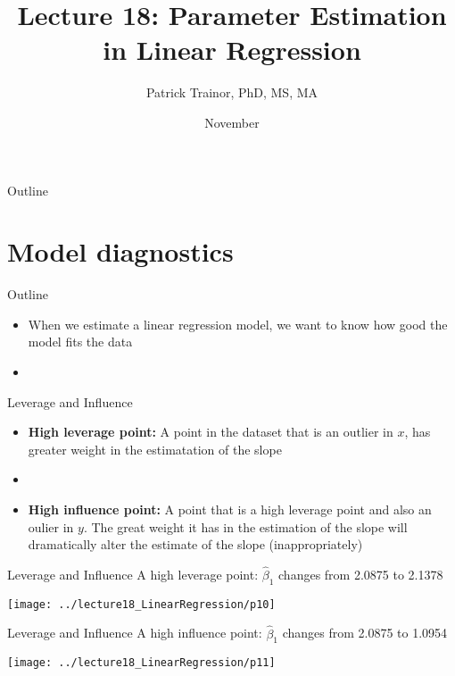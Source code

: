 \documentclass[xcolor=dvipsnames]{beamer}
\title[Lecture 18]{Lecture 18: Parameter Estimation in Linear Regression}
\author[Patrick Trainor]{Patrick Trainor, PhD, MS, MA}
\institute[NMSU]{New Mexico State University}
\date{November}
\begin{document}
\begin{frame}
\maketitle
\end{frame}

\begin{frame}{Outline}
\tableofcontents[hideallsubsections]
\end{frame}

\section{Model diagnostics}
\begin{frame}{Outline}
\tableofcontents[currentsection,subsectionstyle=show/shaded/hide]
\end{frame}

\begin{frame}
	\begin{itemize}
		\item When we estimate a linear regression model, we want to know how good the model fits the data
		\item[]
	\end{itemize}
\end{frame}

\begin{frame}{Leverage and Influence}
	\begin{itemize}
		\item \textbf{High leverage point:} A point in the dataset that is an outlier in $x$, has greater weight in the estimatation of the slope
		\item[]
		\item \textbf{High influence point:} A point that is a high leverage point and also an oulier in $y$. The great weight it has in the estimation of the slope will dramatically alter the estimate of the slope (inappropriately)
	\end{itemize}
\end{frame}

\begin{frame}{Leverage and Influence}
A high leverage point: $\hat{\beta}_1$ changes from 2.0875 to 2.1378
	\begin{center}
		\texttt{[image: ../lecture18\_LinearRegression/p10]}
	\end{center}
\end{frame}

\begin{frame}{Leverage and Influence}
A high influence point: $\hat{\beta}_1$ changes from 2.0875 to 1.0954
\begin{center}
	\texttt{[image: ../lecture18\_LinearRegression/p11]}
\end{center}
\end{frame}
\end{document}
